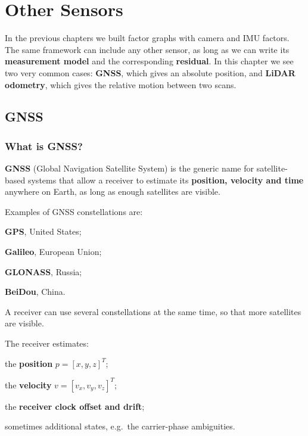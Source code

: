 \section{Other Sensors}

In the previous chapters we built factor graphs with camera and IMU factors. The same framework can include any other sensor, as long as we can write its \textbf{measurement model} and the corresponding \textbf{residual}. In this chapter we see two very common cases: \textbf{GNSS}, which gives an absolute position, and \textbf{LiDAR odometry}, which gives the relative motion between two scans.

\subsection{GNSS}
\subsubsection{What is GNSS?}
\textbf{GNSS} (Global Navigation Satellite System) is the generic name for satellite-based systems that allow a receiver to estimate its \textbf{position, velocity and time} anywhere on Earth, as long as enough satellites are visible.

Examples of GNSS constellations are:
\begin{compactitemize}
    \item \textbf{GPS}, United States;
    \item \textbf{Galileo}, European Union;
    \item \textbf{GLONASS}, Russia;
    \item \textbf{BeiDou}, China.
\end{compactitemize}
A receiver can use several constellations at the same time, so that more satellites are visible.

The receiver estimates:
\begin{compactitemize}
    \item the \textbf{position} $p = [x, y, z]^T$;
    \item the \textbf{velocity} $v = [v_x, v_y, v_z]^T$;
    \item the \textbf{receiver clock offset and drift};
    \item sometimes additional states, e.g.\ the carrier-phase ambiguities.
\end{compactitemize}

